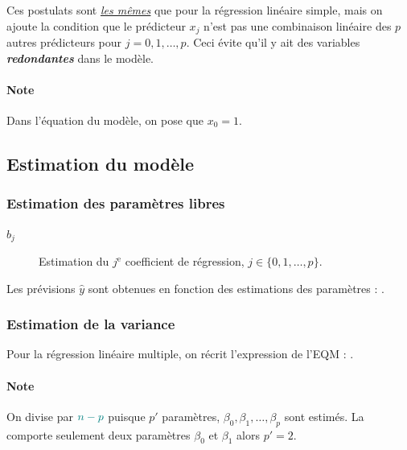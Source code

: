\documentclass[french]{article}
\begin{document}
\begin{multicols*}{2}
\begin{definitionNOHFILL}
\bigskip

Ces postulats sont \textit{\color{bleudefrance}\underline{\hyperlink{postulatsSLR}{\color{bleudefrance} les mêmes}}} que pour la régression linéaire simple, mais on ajoute la condition que le prédicteur $x_{j}$ n'est pas une combinaison linéaire des $p$ autres prédicteurs pour $j = 0, 1, \dots, p$. Ceci évite qu'il y ait des variables \textbf{\textit{redondantes}} dans le modèle.
\end{definitionNOHFILL}

\paragraph{Note}	Dans l'équation du modèle, on pose que $x_{0} = 1$.



\columnbreak
\subsection{Estimation du modèle}
\subsubsection{Estimation des paramètres libres}
\begin{distributions}[Notation]
\begin{description}
	\item[$b_{j}$]	Estimation du $j^{\text{e}}$ coefficient de régression, $j \in \{0, 1, \dots, p\}$.
\end{description}
\end{distributions}

\begin{definitionNOHFILL}
Les prévisions $\hat{y}$ sont obtenues en fonction des estimations des paramètres : . 
\end{definitionNOHFILL}


\subsubsection{Estimation de la variance}
Pour la régression linéaire multiple, on récrit l'expression de l'EQM : . 
	
\paragraph{Note}	On divise par $\textcolor{teal}{n - p}$ puisque $p'$ paramètres, $\beta_{0}, \beta_{1}, \dots, \beta_{p}$ sont estimés. La \textit{\underline{}} comporte seulement deux paramètres $\beta_{0}$ et $\beta_{1}$ alors $p' = 2$.




\end{multicols*}
\end{document}
